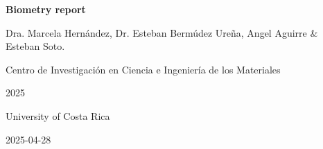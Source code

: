 \begin{titlepage}
  \centering

  {\Huge \textbf{Biometry report} \par}
  \vspace{1.5cm}

  {\Large Dra. Marcela Hernández, Dr. Esteban Bermúdez Ureña, Angel Aguirre \& Esteban Soto. \par}
  \vspace{0.5cm}

  {\Large Centro de Investigación en Ciencia e Ingeniería de los Materiales \par}
  \vspace{0.5cm}

  {\Large 2025 \par}
  {\Large University of Costa Rica \par}
  \vspace{0.5cm}
  {\Large 2025-04-28 \par}

  \vfill
\end{titlepage}
\newpage
